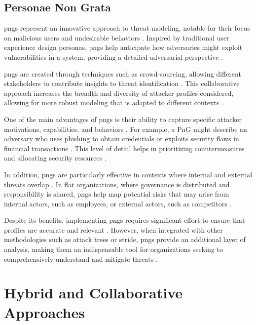 \subsection{Personae Non Grata}
\label{subsec:personae_non_grata}

\gls{pngs} represent an innovative approach to threat modeling, notable for
their focus on malicious users and undesirable behaviors
\cite{PersonaeNonGratae}. Inspired by traditional user experience design
personas, \gls{pngs} help anticipate how adversaries might exploit
vulnerabilities in a system, providing a detailed adversarial perspective
\cite{PnGRequirementsPhaseThreatModeling}.

\gls{pngs} are created through techniques such as crowd-sourcing, allowing
different stakeholders to contribute insights to threat identification
\cite{PnGRequirementsPhaseThreatModeling}. This collaborative approach increases
the breadth and diversity of attacker profiles considered, allowing for more
robust modeling that is adapted to different contexts \cite{PersonaeNonGratae}.

One of the main advantages of \gls{pngs} is their ability to capture specific
attacker motivations, capabilities, and behaviors
\cite{PnGRequirementsPhaseThreatModeling}. For example, a PnG might describe an
adversary who uses phishing to obtain credentials or exploits security flaws in
financial transactions \cite{PersonaeNonGratae}. This level of detail helps in
prioritizing countermeasures and allocating security resources
\cite{PnGRequirementsPhaseThreatModeling}.

In addition, \gls{pngs} are particularly effective in contexts where internal
and external threats overlap \cite{PersonaeNonGratae}. In flat organizations,
where governance is distributed and responsibility is shared, \gls{pngs} help
map potential risks that may arise from internal actors, such as employees, or
external actors, such as competitors \cite{PersonaeNonGratae}.

Despite its benefits, implementing \gls{pngs} requires significant effort to
ensure that profiles are accurate and relevant
\cite{PnGRequirementsPhaseThreatModeling}. However, when integrated with other
methodologies such as attack trees or \gls{stride}, \gls{pngs} provide an
additional layer of analysis, making them an indispensable tool for
organizations seeking to comprehensively understand and mitigate threats
\cite{PnGRequirementsPhaseThreatModeling}.

\section{Hybrid and Collaborative Approaches}
\label{sec:hybrid_collaborative_approaches}


